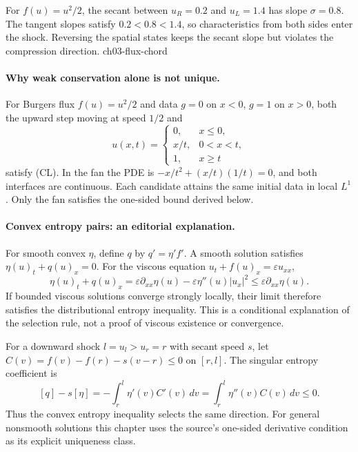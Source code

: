 {For $f(u)=u^2/2$, the secant between $u_R=0.2$ and $u_L=1.4$ has slope $\sigma=0.8$. The tangent slopes satisfy $0.2<0.8<1.4$, so characteristics from both sides enter the shock. Reversing the spatial states keeps the secant slope but violates the compression direction.}
{ch03-flux-chord}

\paragraph{Why weak conservation alone is not unique.}
For Burgers flux $f(u)=u^2/2$ and data $g=0$ on $x<0$, $g=1$ on $x>0$,
both the upward step moving at speed $1/2$ and
\[
 u(x,t)=\begin{cases}
 0,&x\leq0,\\ x/t,&0<x<t,\\1,&x\geq t
 \end{cases}
\]
satisfy (CL). In the fan the PDE is
$-x/t^2+(x/t)(1/t)=0$, and both interfaces are continuous.
Each candidate attains the same initial data in local $L^1$.
Only the fan satisfies the one-sided bound derived below.
\Needspace{45mm}

\paragraph{Convex entropy pairs: an editorial explanation.}
For smooth convex $\eta$, define $q$ by $q'=\eta'f'$.
A smooth solution satisfies $\eta(u)_t+q(u)_x=0$.
For the viscous equation $u_t+f(u)_x=\varepsilon u_{xx}$,
\[
 \eta(u)_t+q(u)_x
 =\varepsilon\partial_{xx}\eta(u)
       -\varepsilon\eta''(u)|u_x|^2
 \leq\varepsilon\partial_{xx}\eta(u).
\]
If bounded viscous solutions converge strongly locally, their limit
therefore satisfies the distributional entropy inequality.
This is a conditional explanation of the selection rule, not a proof
of viscous existence or convergence.

For a downward shock $l=u_l>u_r=r$ with secant speed $s$, let
$C(v)=f(v)-f(r)-s(v-r)\leq0$ on $[r,l]$.
The singular entropy coefficient is
\[
 [q]-s[\eta]=-\int_r^l\eta'(v)C'(v)\,dv
            =\int_r^l\eta''(v)C(v)\,dv\leq0.
\]
Thus the convex entropy inequality selects the same direction.
For general nonsmooth solutions this chapter uses the source's
one-sided derivative condition as its explicit uniqueness class.

